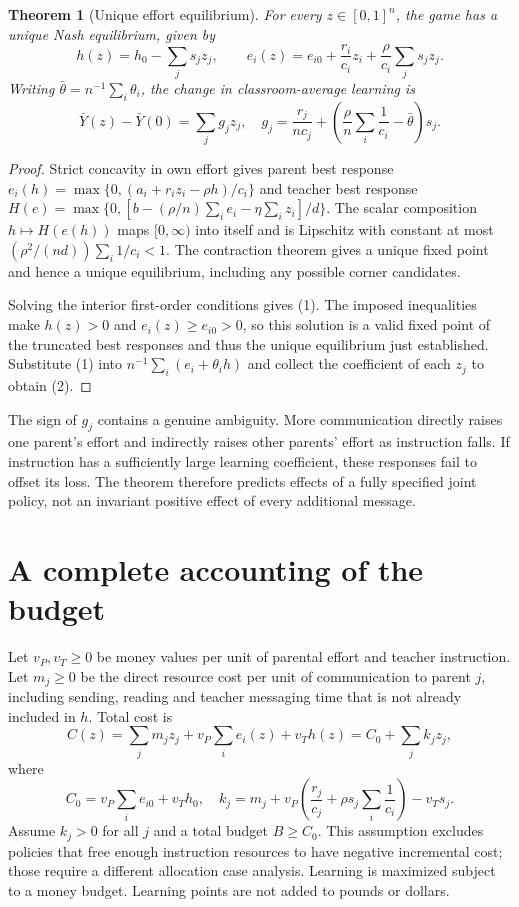 \documentclass[11pt,a4paper]{article}
\newtheorem{theorem}{Theorem}[section]
\theoremstyle{definition}
\theoremstyle{remark}
\begin{document}
\begin{theorem}[Unique effort equilibrium]
For every $z\in[0,1]^n$, the game has a unique Nash equilibrium, given by
\[
 h(z)=h_0-\sum_j s_jz_j,\qquad
 e_i(z)=e_{i0}+\frac{r_i}{c_i}z_i+\frac\rho{c_i}\sum_j s_jz_j.\tag{1}
\]
Writing $\bar\theta=n^{-1}\sum_i\theta_i$, the change in classroom-average learning is
\[
 \bar Y(z)-\bar Y(0)=\sum_j g_jz_j,\quad
 g_j=\frac{r_j}{nc_j}+\left(\frac\rho n\sum_i\frac1{c_i}-\bar\theta\right)s_j.\tag{2}
\]
\end{theorem}
\begin{proof}
Strict concavity in own effort gives parent best response
$e_i(h)=\max\{0,(a_i+r_i z_i-\rho h)/c_i\}$ and teacher best response
$H(e)=\max\{0,[b-(\rho/n)\sum_i e_i-\eta\sum_i z_i]/d\}$.
The scalar composition $h\mapsto H(e(h))$ maps $[0,\infty)$ into itself and is Lipschitz with constant at most $(\rho^2/(nd))\sum_i1/c_i<1$. The contraction theorem gives a unique fixed point and hence a unique equilibrium, including any possible corner candidates.

Solving the interior first-order conditions gives (1). The imposed inequalities make $h(z)>0$ and $e_i(z)\geq e_{i0}>0$, so this solution is a valid fixed point of the truncated best responses and thus the unique equilibrium just established. Substitute (1) into $n^{-1}\sum_i(e_i+\theta_i h)$ and collect the coefficient of each $z_j$ to obtain (2).
\end{proof}

The sign of $g_j$ contains a genuine ambiguity. More communication directly raises one parent's effort and indirectly raises other parents' effort as instruction falls. If instruction has a sufficiently large learning coefficient, these responses fail to offset its loss. The theorem therefore predicts effects of a fully specified joint policy, not an invariant positive effect of every additional message.

\section{A complete accounting of the budget}
Let $v_P,v_T\geq0$ be money values per unit of parental effort and teacher instruction. Let $m_j\geq0$ be the direct resource cost per unit of communication to parent $j$, including sending, reading and teacher messaging time that is not already included in $h$. Total cost is
\[
 C(z)=\sum_jm_jz_j+v_P\sum_i e_i(z)+v_T h(z)
      =C_0+\sum_j k_jz_j,
\]
where
\[
 C_0=v_P\sum_i e_{i0}+v_T h_0,\quad
 k_j=m_j+v_P\left(\frac{r_j}{c_j}+\rho s_j\sum_i\frac1{c_i}\right)-v_Ts_j.
\]
Assume $k_j>0$ for all $j$ and a total budget $B\geq C_0$. This assumption excludes policies that free enough instruction resources to have negative incremental cost; those require a different allocation case analysis. Learning is maximized subject to a money budget. Learning points are not added to pounds or dollars.
\end{document}
